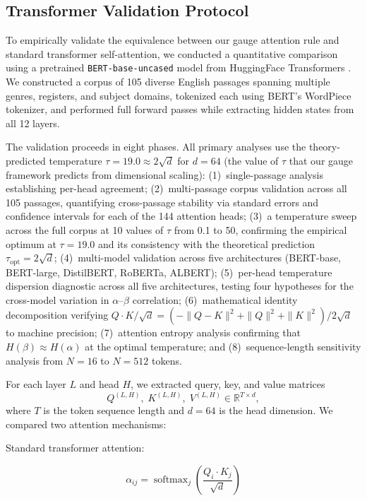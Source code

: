 \documentclass[twoside,11pt]{article}
\begin{document}
\subsection{Transformer Validation Protocol}
To empirically validate the equivalence between our gauge attention rule and standard transformer self-attention, we conducted a quantitative comparison using a pretrained \texttt{BERT-base-uncased} model from HuggingFace Transformers \citep{devlin2018bert}. We constructed a corpus of 105 diverse English passages spanning multiple genres, registers, and subject domains, tokenized each using BERT's WordPiece tokenizer, and performed full forward passes while extracting hidden states from all 12 layers.

The validation proceeds in eight phases. All primary analyses use the theory-predicted temperature $\tau = 19.0 \approx 2\sqrt{d}$ for $d = 64$ (the value of $\tau$ that our gauge framework predicts from dimensional scaling): (1)~single-passage analysis establishing per-head agreement; (2)~multi-passage corpus validation across all 105 passages, quantifying cross-passage stability via standard errors and confidence intervals for each of the 144 attention heads; (3)~a temperature sweep across the full corpus at 10 values of $\tau$ from 0.1 to 50, confirming the empirical optimum at $\tau = 19.0$ and its consistency with the theoretical prediction $\tau_{\text{opt}} = 2\sqrt{d}$; (4)~multi-model validation across five architectures (BERT-base, BERT-large, DistilBERT, RoBERTa, ALBERT); (5)~per-head temperature dispersion diagnostic across all five architectures, testing four hypotheses for the cross-model variation in $\alpha$--$\beta$ correlation; (6)~mathematical identity decomposition verifying $Q \cdot K / \sqrt{d} = (-\|Q-K\|^2 + \|Q\|^2 + \|K\|^2)/2\sqrt{d}$ to machine precision; (7)~attention entropy analysis confirming that $H(\beta) \approx H(\alpha)$ at the optimal temperature; and (8)~sequence-length sensitivity analysis from $N = 16$ to $N = 512$ tokens.

For each layer $L$ and head $H$, we extracted query, key, and value matrices
\[
Q^{(L,H)},\; K^{(L,H)},\; V^{(L,H)} \in \mathbb{R}^{T \times d},
\]
where $T$ is the token sequence length and $d = 64$ is the head dimension. We compared two attention mechanisms:

Standard transformer attention:

\begin{equation}
\alpha_{ij} = \operatorname{softmax}_j\!\left( \frac{Q_i \cdot K_j}{\sqrt{d}} \right)
\end{equation}
\end{document}
